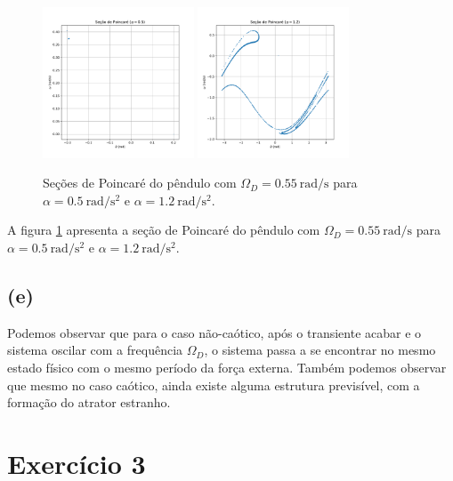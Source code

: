 \documentclass[a4paper, brazil]{article}
\begin{document}
\begin{figure}[ht]
\centering
\includegraphics[width=0.4\textwidth]{fig2d1.pdf}
\includegraphics[width=0.4\textwidth]{fig2d2.pdf}
\caption{Seções de Poincaré do pêndulo com \( \Omega_D = \SI{0.55}{\radian\per\second} \) para \( \alpha = \SI{0.5}{\radian\per\second\squared} \) e \( \alpha = \SI{1.2}{\radian\per\second\squared} \).}
\label{fig2d}
\end{figure}

A figura \ref{fig2d} apresenta a seção de Poincaré do pêndulo com \( \Omega_D = \SI{0.55}{\radian\per\second} \) para \( \alpha = \SI{0.5}{\radian\per\second\squared} \) e \( \alpha = \SI{1.2}{\radian\per\second\squared} \).

\subsection{(e)}

Podemos observar que para o caso não-caótico, após o transiente acabar e o sistema oscilar com a frequência \( \Omega_D \), o sistema passa a se encontrar no mesmo estado físico com o mesmo período da força externa.
Também podemos observar que mesmo no caso caótico, ainda existe alguma estrutura previsível, com a formação do atrator estranho.

\newpage
\section{Exercício 3}
\end{document}
